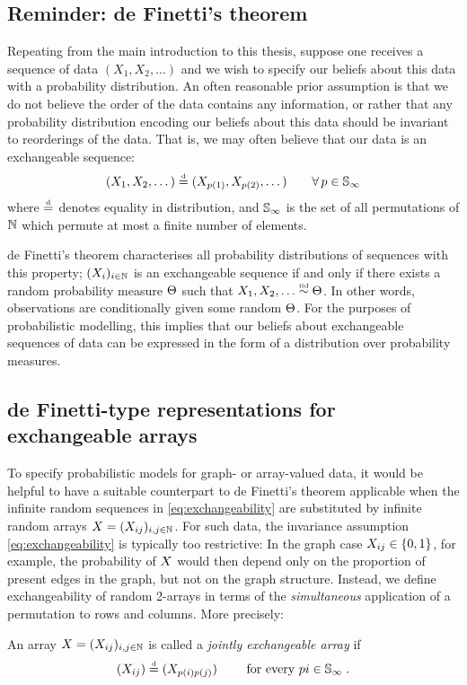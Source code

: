 \subsection{Reminder: de Finetti's theorem}

Repeating from the main introduction to this thesis, suppose one receives a sequence of data $(X_1, X_2, \dots)$ and we wish to specify our beliefs about this data with a probability distribution.
An often reasonable prior assumption is that we do not believe the order of the data contains any information, or rather that any probability distribution encoding our beliefs about this data should be invariant to reorderings of the data.
That is, we may often believe that our data is an exchangeable sequence:
\[
  \label{eq:networks:exch}
  (X_1, X_2, \dots) \stackrel{\mbox{\tiny d}}{=} (X_{p(1)}, X_{p(2)}, \dots) \qquad \forall\, p\in\mathbb{S}_{\infty}
\]
where $\stackrel{\mbox{\tiny d}}{=}$ denotes equality in distribution, and $\mathbb{S}_{\infty}$ is the set of all permutations of $\mathbb{N}$ which permute at most a finite number of elements.

de Finetti's theorem \citep[e.g.][]{Kallenberg2002-il} characterises all probability distributions of sequences with this property;  $(X_i)_{i\in\mathbb{N}}$ is an exchangeable sequence if and only if there exists a random probability measure $\Theta$ such that $X_1,X_2,\ldots\overset{\mbox{\tiny iid}}{\sim}\Theta$.
In other words, observations are conditionally \iid given some random $\Theta$.
For the purposes of probabilistic modelling, this implies that our beliefs about exchangeable sequences of data can be expressed in the form of a distribution over probability measures.

\subsection{de Finetti-type representations for exchangeable arrays}

To specify probabilistic models for graph- or array-valued data, it would be helpful to have a suitable counterpart to de Finetti's theorem applicable when the infinite random sequences in \eqref{eq:exchangeability} are substituted by infinite random arrays $X=(X_{ij})_{i,j\in\mathbb{N}}$.
For such data, the invariance assumption \eqref{eq:exchangeability} is typically too restrictive: In the graph case $X_{ij}\in\lbrace 0,1\rbrace$, for example, the probability of $X$ would then depend only on the proportion of present edges in the graph, but not on the graph structure.
Instead, we define exchangeability of random 2-arrays in terms of the \emph{simultaneous} application of a permutation to rows and columns.
More precisely:
\begin{definition}
  An array $X=(X_{ij})_{i,j\in\mathbb{N}}$ is called a \emph{jointly exchangeable array} if 
  \begin{equation}
    \label{eq:jointly:ex}
    (X_{ij})\stackrel{\mbox{\tiny d}}{=}(X_{p(i)p(j)}) \qquad\text{ for every }pi\in\mathbb{S}_{\infty}\;.
  \end{equation}
\end{definition}

